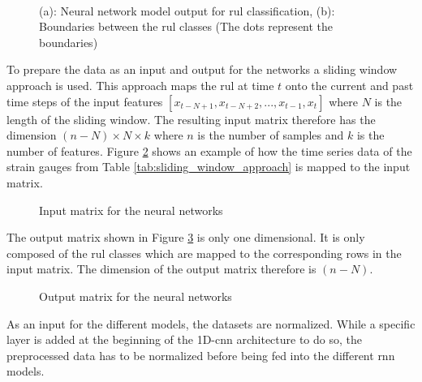 \documentclass[conference]{IEEEtran}
\begin{document}
\begin{figure}[htp]
	\centering
	\\
	\caption{(a): Neural network model output for \gls{rul} classification, (b): Boundaries between the \gls{rul} classes (The dots represent the boundaries)}
	\label{fig:RNN_classification}
\end{figure}

To prepare the data as an input and output for the networks a sliding window approach is used. This approach maps the \gls{rul} at time $ t $ onto the current and past time steps of the input features $ [x_{t-N+1}, x_{t-N+2},..., x_{t-1}, x_t] $ where $ N $ is the length of the sliding window. The resulting input matrix therefore has the dimension $ (n-N) \times N \times k $ where $ n $ is the number of samples and $ k $ is the number of features. Figure \ref{fig:input_matrix} shows an example of how the time series data of the strain gauges from Table \ref{tab:sliding_window_approach} is mapped to the input matrix.

\begin{figure}[htp]
	\centering
	
	\caption{Input matrix for the neural networks}
	\label{fig:input_matrix}
\end{figure}

The output matrix shown in Figure \ref{fig:output_matrix} is only one dimensional. It is only composed of the \gls{rul} classes which are mapped to the corresponding rows in the input matrix. The dimension of the output matrix therefore is $ (n-N) $.

\begin{figure}[htp]
	\centering
	
	\caption{Output matrix for the neural networks}
	\label{fig:output_matrix}
\end{figure}

As an input for the different models, the datasets are normalized. While a specific layer is added at the beginning of the 1D-\gls{cnn} architecture to do so, the preprocessed data has to be normalized before being fed into the different \gls{rnn} models.
\end{document}
